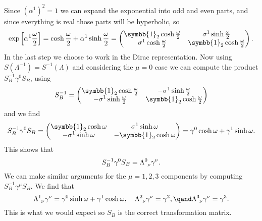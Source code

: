 \documentclass[fleqn]{NotesClass}
\newcommand{\ident}{\symbb{1}}
\begin{document}
    Since \((\alpha^1)^2 = 1\) we can expand the exponential into odd and even parts, and since everything is real those parts will be hyperbolic, so
    \begin{equation}
        \exp\left[ \alpha^1 \frac{\omega}{2} \right] = \cosh\frac{\omega}{2} + \alpha^1 \sinh\frac{\omega}{2} = 
        \begin{pmatrix}
            \ident_2 \cosh\frac{\omega}{2} & \sigma^1 \sinh\frac{\omega}{2}\\
            \sigma^1 \cosh\frac{\omega}{2} & \ident_2\cosh\frac{\omega}{2}
        \end{pmatrix}
        .
    \end{equation}
    In the last step we choose to work in the Dirac representation.
    Now using \(S(\Lambda^{-1}) = S^{-1}(\Lambda)\) and considering the \(\mu = 0\) case we can compute the product \(S_B^{-1}\gamma^0S_B\), using
    \begin{equation}
        S_B^{-1} =
        \begin{pmatrix}
            \ident_2\cosh\frac{\omega}{2} & -\sigma^1\sinh\frac{\omega}{2}\\
            -\sigma^1\sinh\frac{\omega}{2} & \ident_2\cosh\frac{\omega}{2}
        \end{pmatrix}
    \end{equation}
    and we find
    \begin{equation}
        S_B^{-1}\gamma^0S_B = 
        \begin{pmatrix}
            \ident_2\cosh \omega & \sigma^1\sinh\omega\\
            -\sigma^1\sinh\omega & -\ident_2\cosh\omega
        \end{pmatrix}
        = \gamma^0 \cosh\omega + \gamma^1\sinh\omega.
    \end{equation}
    This shows that
    \begin{equation}
        S_B^{-1} \gamma^0 S_B = \tensor{\Lambda}{^0_\nu}\gamma^\nu.
    \end{equation}
    We can make similar arguments for the \(\mu = 1, 2, 3\) components by computing \(S_B^{-1}\gamma^\mu S_B\).
    We find that
    \begin{equation}
        \tensor{\Lambda}{^1_\nu}\gamma^\nu = \gamma^0\sinh \omega + \gamma^1 \cosh \omega, \quad \tensor{\Lambda}{^2_\nu}\gamma^\nu = \gamma^2, \qand \tensor{\Lambda}{^3_\nu}\gamma^\nu = \gamma^3.
    \end{equation}
    This is what we would expect so \(S_B\) is the correct transformation matrix.
    
\end{document}
